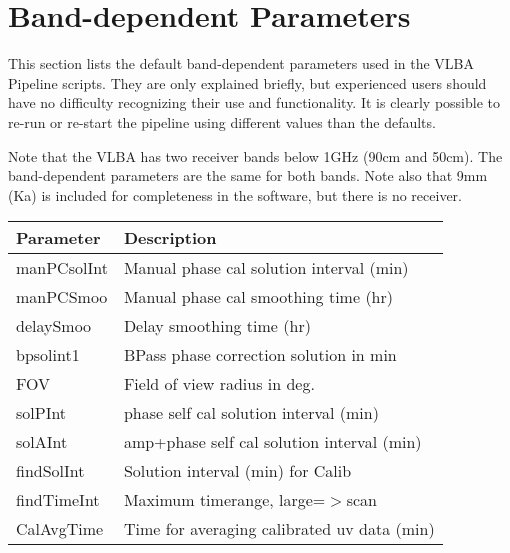 \documentclass[11pt]{article}
\begin{document}
\vfill
\section{Band-dependent Parameters}

This section lists the default band-dependent parameters used in the VLBA
Pipeline scripts.  They are only explained briefly, but experienced users
should have no difficulty recognizing their use and functionality.  It is
clearly possible to re-run or re-start the pipeline using different values than
the defaults.

Note that the VLBA has two receiver bands below 1GHz (90cm and 50cm).  The
band-dependent parameters are the same for both bands.  Note also that 9mm (Ka)
is included for completeness in the software, but there is no receiver.

\clearpage
\begin{center}
\begin{tabular}{|l|l|}

\hline
Parameter & Description \\
\hline
manPCsolInt & Manual phase cal solution interval (min) \\
manPCSmoo & Manual phase cal smoothing time (hr) \\
delaySmoo & Delay smoothing time (hr) \\
bpsolint1 & BPass phase correction solution in min \\
FOV & Field of view radius in deg. \\
solPInt & phase self cal solution interval (min) \\
solAInt & amp+phase self cal solution interval (min) \\
findSolInt & Solution interval (min) for Calib \\
findTimeInt & Maximum timerange, large=$>$scan \\
CalAvgTime & Time for averaging calibrated uv data (min) \\
\hline

\end{tabular}
\end{center}
\end{document}
